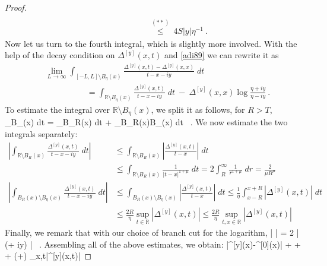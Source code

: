 \documentclass[12pt]{article}
\theoremstyle{plain}
\theoremstyle{definition}
\numberwithin{equation}{section}
\numberwithin{theorem}{section}
\def\be#1\ee{\begin{equation}#1\end{equation}}
\begin{document}
\begin{proof}
\begin{align}
\\
& \hspace{5em}
\overset{(**)}{\leq}~ 4 S |y| \eta^{-1}  \ .
\end{align}
Now let us turn to the fourth integral, which is slightly more involved. With the help of the decay condition on $\Delta^{[y]}(x,t)$
and \eqref{adi89} we can rewrite it as
\begin{align}
&\lim_{L\rightarrow\infty}\int_{[-L,L]\setminus B_\eta(x)}  \frac{\Delta^{[y]}(x,t)-\Delta^{[y]}(x,x)}{t-x-iy} \;dt 
\nonumber \\ 
&\hspace{5em}
= \int_{\mathbb{R}\setminus B_\eta(x)} \frac{\Delta^{[y]}(x,t)}{t-x-iy} \;dt ~-~ \Delta^{[y]}(x,x) \log \frac{\eta+iy}{\eta-iy} \ .
\end{align}
To estimate the integral over $\mathbb{R}\setminus B_\eta(x)$, we split it as follows, for $R > T$,
\be
\int_{\setminus B_\eta(x)}  \;dt = \int_{\setminus B_R(x)}  \;dt + \int_{B_R(x)\setminus B_\eta(x)}  \;dt \ .
\ee
We now estimate the two integrals separately:
\begin{align}
\left|\int_{\mathbb{R}\setminus B_R(x)} \frac{\Delta^{[y]}(x,t)}{t-x-iy} \;dt\right|
&
\leq 
\int_{\mathbb{R}\setminus B_R(x)} \left|\frac{\Delta^{[y]}(x,t)}{t-x}\right| \;dt \nonumber\\
&\leq \int_{\mathbb{R}\setminus B_R(x)} \frac{1}{|t-x|^{1+\mu}} \;dt = 2\int_R^\infty \frac{1}{r^{1+\mu}} \;dr  = \frac{2}{\mu R^\mu}
\\
\left|\int_{B_R(x)\setminus B_\eta(x)} \frac{\Delta^{[y]}(x,t)}{t-x-iy} \;dt\right|
&
\leq \int_{B_R(x)\setminus B_\eta(x)} \left|\frac{\Delta^{[y]}(x,t)}{t-x}\right| \;dt 
\leq \frac{1}{\eta}\int_{x-R}^{x+R} |\Delta^{[y]}(x,t)|  \;dt 
\nonumber\\
&
\leq \frac{2R}{\eta} \sup_{t\in\mathbb{R}}|\Delta^{[y]}(x,t)| 
\leq \frac{2R}{\eta} \sup_{t,x\in\mathbb{R}}|\Delta^{[y]}(x,t)|
\end{align}
Finally, we remark that with our choice of branch cut for the logarithm,
\be
\left| \log {} \right|
 = 2 \left| (\eta + iy) \right|
 \le \pi \ .
\ee
Assembling all of the above estimates, we obtain:
\be\label{psi-unif-conv-estimate}
\left|\psi^{[y]}(x)-\psi^{[0]}(x)\right|\leq {} 
+   + 
 + \left(+\pi\right) \sup_{x,t\in{}}|\Delta^{[y]}(x,t)|
\ee


\end{proof}
\end{document}
